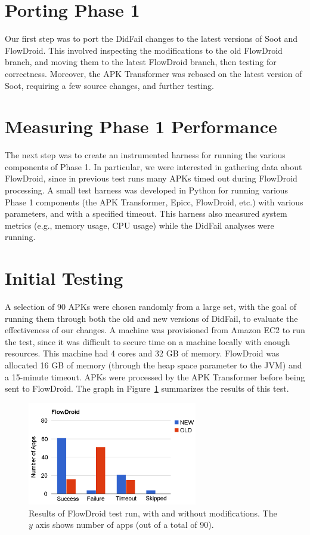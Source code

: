 \section{Porting Phase 1}
Our first step was to port the DidFail changes to the latest versions of Soot and FlowDroid.  This involved inspecting the modifications to the old FlowDroid branch, and moving them to the latest FlowDroid branch, then testing for correctness.  Moreover, the APK Transformer was rebased on the latest version of Soot, requiring a few source changes, and further testing.

\section{Measuring Phase 1 Performance}
The next step was to create an instrumented harness for running the various components of Phase 1.  In particular, we were interested in gathering data about FlowDroid, since in previous test runs many APKs timed out during FlowDroid processing.  A small test harness was developed in Python for running various Phase 1 components (the APK Transformer, Epicc, FlowDroid, etc.) with various parameters, and with a specified timeout.  This harness also measured system metrics (e.g., memory usage, CPU usage) while the DidFail analyses were running.  

\section{Initial Testing}
A selection of 90 APKs were chosen randomly from a large set, with the goal of running them through both the old and new versions of DidFail, to evaluate the effectiveness of our changes.  A machine was provisioned from Amazon EC2 to run the test, since it was difficult to secure time on a machine locally with enough resources.  This machine had 4 cores and 32 GB of memory.  FlowDroid was allocated 16 GB of memory (through the heap space parameter to the JVM) and a 15-minute timeout.  APKs were processed by the APK Transformer before being sent to FlowDroid.  The graph in Figure~\ref{fig:initial_phase1} summarizes the results of this test.

\begin{figure}[h]
	\centering
	\begin{minipage}{0.85\textwidth}
	\centering
	\includegraphics[width=0.66\textwidth]{flowdroid_success2.png}
	\caption[Results of FlowDroid test run, with and without modifications]{Results of FlowDroid test run, with and without modifications. The $y$ axis shows number of apps (out of a total of 90).}
	\label{fig:initial_phase1}
	\end{minipage}
\end{figure}

